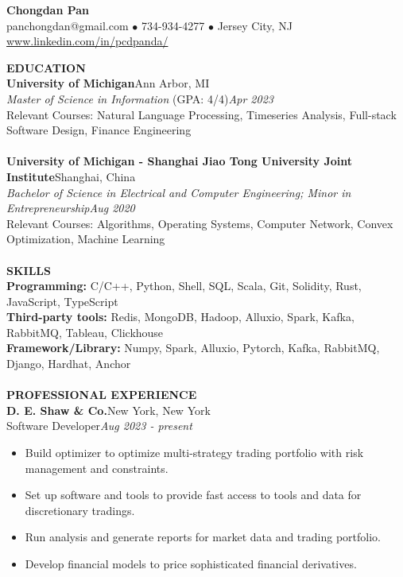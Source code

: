 \documentclass[10pt,a4paper]{article}
\begin{document}
\begin{center}
    \Large{\textbf{Chongdan Pan}}\\
    \normalsize{panchongdan@gmail.com $\bullet$ 734-934-4277 $\bullet$ Jersey City, NJ}\\
    \normalsize{\href{https://www.linkedin.com/in/pandapcd/}{www.linkedin.com/in/pcdpanda/}}
\end{center}
\noindent
\rlap{\rule[-1mm]{\linewidth}{.5mm}}\textbf{\large{EDUCATION}}\\
\noindent\textbf{University of Michigan}\hfill Ann Arbor, MI\\
\emph{Master of Science in Information} (GPA: 4/4)\hfill\emph{Apr 2023}\\
Relevant Courses: Natural Language Processing, Timeseries Analysis, Full-stack Software Design, Finance Engineering \\\\
\textbf{University of Michigan - Shanghai Jiao Tong University Joint Institute}\hfill Shanghai, China\\
\emph{Bachelor of Science in Electrical and Computer Engineering; Minor in Entrepreneurship}\hfill\emph{Aug 2020}\\
Relevant Courses: Algorithms, Operating Systems, Computer Network, Convex Optimization, Machine Learning\\\\
\noindent
\rlap{\rule[-1mm]{\linewidth}{.5mm}}\textbf{\large{SKILLS}}\\
\textbf{Programming: }C/C++, Python, Shell, SQL, Scala, Git, Solidity, Rust, JavaScript, TypeScript\\
\textbf{Third-party tools: }Redis, MongoDB, Hadoop, Alluxio, Spark, Kafka, RabbitMQ, Tableau, Clickhouse\\
\textbf{Framework/Library: }Numpy, Spark, Alluxio, Pytorch, Kafka, RabbitMQ, Django, Hardhat, Anchor\\\\
\noindent
\rlap{\rule[-1mm]{\linewidth}{.5mm}}\textbf{\large{PROFESSIONAL EXPERIENCE}}\\
\textbf{D. E. Shaw \& Co.}\hfill New York, New York\\
Software Developer\hfill\emph{Aug 2023 - present}
\begin{itemize}[noitemsep,topsep=0pt]
    \item Build optimizer to optimize multi-strategy trading portfolio with risk management and constraints.
    \item Set up software and tools to provide fast access to tools and data for discretionary tradings.
    \item Run analysis and generate reports for market data and trading portfolio.
    \item Develop financial models to price sophisticated financial derivatives.
\end{itemize}
\end{document}
